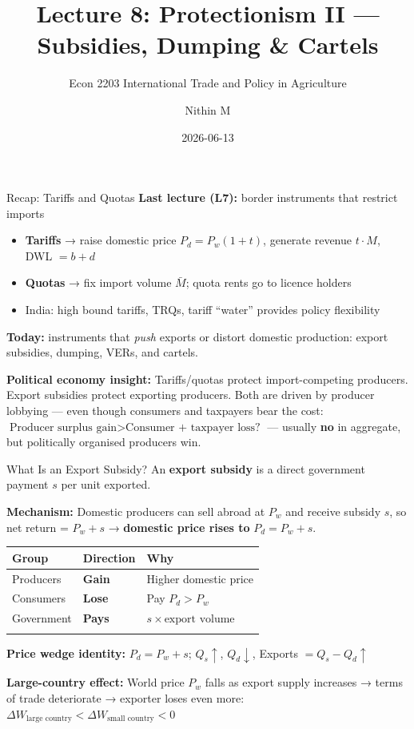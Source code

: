 \documentclass[
  ignorenonframetext,
  aspectratio=169,
]{beamer}
\title[L8 \textbar{} Protectionism II]{Lecture 8: Protectionism II ---
Subsidies, Dumping \& Cartels}
\subtitle{Econ 2203 \textbar{} International Trade and Policy in
Agriculture}
\author{Nithin M}
\date{2026-06-13}
\institute{Department of Development Economics}
\makeatletter
\providecommand{\tightlist}{%
  \setlength{\itemsep}{0pt}\setlength{\parskip}{0pt}}
\let\quarto@originallabel\label
\DeclareRobustCommand*{\label}[1]{\quarto@originallabel{#1}}
\makeatother
\begin{document}
\frame{\titlepage}


\begin{frame}{Recap: Tariffs and Quotas}
\label{recap-tariffs-and-quotas}
\textbf{Last lecture (L7):} border instruments that restrict imports

\begin{itemize}
\tightlist
\item
  \textbf{Tariffs} → raise domestic price \(P_d = P_w(1+t)\), generate
  revenue \(t \cdot M\), DWL \(= b + d\)
\item
  \textbf{Quotas} → fix import volume \(\bar{M}\); quota rents go to
  licence holders
\item
  India: high bound tariffs, TRQs, tariff ``water'' provides policy
  flexibility
\end{itemize}

\textbf{Today:} instruments that \emph{push} exports or distort domestic
production: export subsidies, dumping, VERs, and cartels.

\textbf{Political economy insight:} Tariffs/quotas protect
import-competing producers. Export subsidies protect exporting
producers. Both are driven by producer lobbying --- even though
consumers and taxpayers bear the cost:
\(\text{Producer surplus gain} > \text{Consumer + taxpayer loss?}\) ---
usually \textbf{no} in aggregate, but politically organised producers
win.
\end{frame}

\begin{frame}{What Is an Export Subsidy?}
\label{what-is-an-export-subsidy}
An \textbf{export subsidy} is a direct government payment \(s\) per unit
exported.

\textbf{Mechanism:} Domestic producers can sell abroad at \(P_w\) and
receive subsidy \(s\), so net return = \(P_w + s\) → \textbf{domestic
price rises to} \(P_d = P_w + s\).

\begin{longtable}[]{@{}lll@{}}
\toprule\noalign{}
Group & Direction & Why \\
\midrule\noalign{}
\endhead
Producers & \textbf{Gain} & Higher domestic price \\
Consumers & \textbf{Lose} & Pay \(P_d > P_w\) \\
Government & \textbf{Pays} & \(s \times \text{export volume}\) \\
\bottomrule\noalign{}
\end{longtable}

\textbf{Price wedge identity:} \(\boxed{P_d = P_w + s}\);
\(Q_s \uparrow\), \(Q_d \downarrow\), Exports \(= Q_s - Q_d \uparrow\)

\textbf{Large-country effect:} World price \(P_w\) falls as export
supply increases → terms of trade deteriorate → exporter loses even
more:
\(\Delta W_{\text{large country}} < \Delta W_{\text{small country}} < 0\)
\end{frame}
\end{document}
